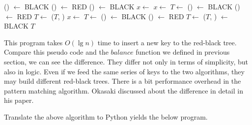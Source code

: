 \documentclass[b5paper]{article}
\begin{document}
\begin{algorithmic}[1]
      \State {}() $\gets$ BLACK
      \State {}() $\gets$ RED
      \State {}() $\gets$ BLACK
      \State $x \gets$ 
    \Else
          \State $x \gets$ 
          \State $T \gets$ 
        \EndIf
        \State {}() $\gets$ BLACK
        \State {}() $\gets$ RED
        \State $T \gets$ ($T$, )
      \Else
          \State $x \gets$ 
          \State $T \gets$ 
        \EndIf
        \State {}() $\gets$ BLACK
        \State {}() $\gets$ RED
        \State $T \gets$ ($T$, )
      \EndIf
    \EndIf
  \EndWhile
  \State {} $\gets$ BLACK
  \State \Return $T$
\EndFunction
\end{algorithmic}

This program takes $O(\lg n)$ time to insert a new key to the red-black tree.
Compare this pseudo code and the $balance$ function we defined in previous
section, we can see the difference. They differ not only in terms of
simplicity, but also in logic. Even if we feed the same series of keys to
the two algorithms, they may build different red-black trees. There
is a bit performance overhead in the pattern matching algorithm.
Okasaki discussed about the difference in detail in his paper\cite{okasaki}.

Translate the above algorithm to Python yields the below program.
\end{document}
